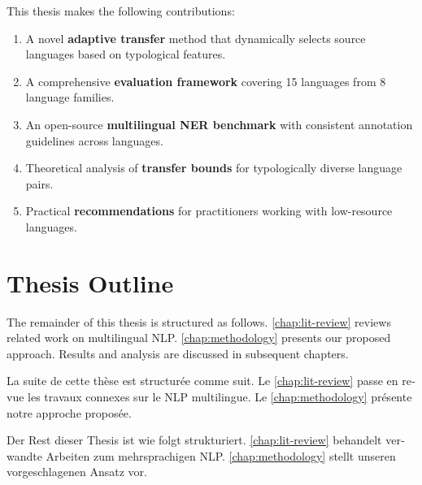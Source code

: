 This thesis makes the following contributions:

\begin{enumerate}
    \item A novel \textbf{adaptive transfer} method that dynamically
          selects source languages based on typological features.

    \item A comprehensive \textbf{evaluation framework} covering 15
          languages from 8 language families.

    \item An open-source \textbf{multilingual NER benchmark} with
          consistent annotation guidelines across languages.

    \item Theoretical analysis of \textbf{transfer bounds} for
          typologically diverse language pairs.

    \item Practical \textbf{recommendations} for practitioners working
          with low-resource languages.
\end{enumerate}

\section{Thesis Outline}
The remainder of this thesis is structured as follows.
\cref{chap:lit-review} reviews related work on multilingual NLP.
\cref{chap:methodology} presents our proposed approach.
Results and analysis are discussed in subsequent chapters.

\foreignlanguage{french}{La suite de cette thèse est structurée comme
suit.  Le \cref{chap:lit-review} passe en revue les travaux connexes
sur le NLP multilingue.  Le \cref{chap:methodology} présente notre
approche proposée.}

\foreignlanguage{german}{Der Rest dieser Thesis ist wie folgt
strukturiert.  \cref{chap:lit-review} behandelt verwandte Arbeiten
zum mehrsprachigen NLP.  \cref{chap:methodology} stellt unseren
vorgeschlagenen Ansatz vor.}

